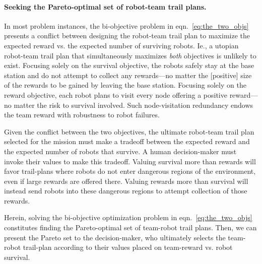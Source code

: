\documentclass[11pt, oneside]{article}
\begin{document}
\paragraph{Seeking the Pareto-optimal set of robot-team trail plans.} 
In most problem instances, the bi-objective problem in eqn.~\ref{eq:the_two_objs} presents a conflict between designing the robot-team trail plan to maximize the expected reward vs. the expected number of surviving robots. Ie., a utopian robot-team trail plan that simultaneously maximizes \emph{both} objectives is unlikely to exist.
Focusing solely on the survival objective, the robots safely stay at the base station and do not attempt to collect any rewards---no matter the [positive] size of the rewards to be gained by leaving the base station. 
Focusing solely on the reward objective, each robot plans to visit every node offering a positive reward---no matter the risk to survival involved. Such node-visitation redundancy endows the team reward with robustness to robot failures.

Given the conflict between the two objectives, the ultimate robot-team trail plan selected for the mission must make a tradeoff between the expected reward and the expected number of robots that survive. 
A human decision-maker must invoke their values to make this tradeoff.
Valuing survival more than rewards will favor trail-plans where robots do not enter dangerous regions of the environment, even if large rewards are offered there. 
Valuing rewards more than survival will instead send robots into these dangerous regions to attempt collection of those rewards. 

Herein, solving the bi-objective optimization problem in eqn.~\ref{eq:the_two_objs} constitutes finding the Pareto-optimal set of team-robot trail plans. Then, we can present the Pareto set to the decision-maker, who ultimately selects the team-robot trail-plan according to their values placed on team-reward vs. robot survival. 
\end{document}
